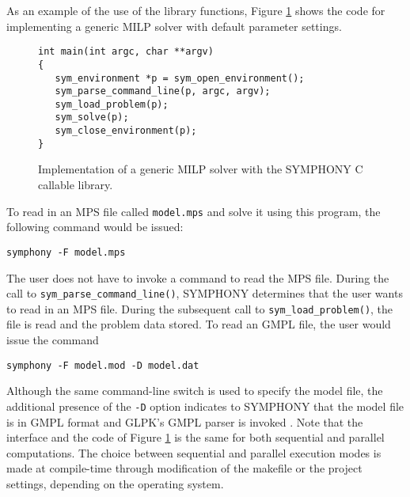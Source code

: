 \noindent As an example of the use of the library functions, Figure
\ref{default_main} shows the code for implementing a generic MILP solver with
default parameter settings.
\begin{figure}[tb]
\begin{Verbatim}[frame=lines]
int main(int argc, char **argv)
{
   sym_environment *p = sym_open_environment();
   sym_parse_command_line(p, argc, argv);
   sym_load_problem(p);
   sym_solve(p);
   sym_close_environment(p);
}
\end{Verbatim}
\caption{Implementation of a generic MILP solver with the SYMPHONY
C callable library. \label{default_main}}
\end{figure}
To read in an MPS file called \texttt{model.mps} and solve it using 
this program, the following command would be issued: \\
\begin{verbatim}
symphony -F model.mps
\end{verbatim}
The user does not have to invoke a command to read the MPS file. During the
call to \texttt{sym\_parse\_command\_line()}, SYMPHONY determines that the
user wants to read in an MPS file. During the subsequent call to
\texttt{sym\_load\_problem()}, the file is read and the problem data stored.
To read an GMPL file, the user would issue the command
\begin{verbatim}
symphony -F model.mod -D model.dat
\end{verbatim}
Although the same command-line switch is used to specify the model file, the
additional presence of the \texttt{-D} option indicates to SYMPHONY that the
model file is in GMPL format and GLPK's GMPL parser is invoked
\cite{GLPK}. Note that the interface and the code of Figure \ref{default_main}
is the same for both sequential and parallel computations. The choice between
sequential and parallel execution modes is made at compile-time through
modification of the makefile or the project settings, depending on the
operating system.

